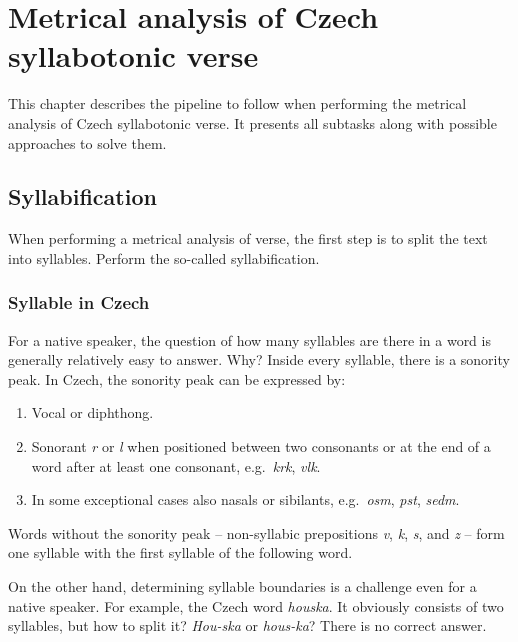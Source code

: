 \chapter{Metrical analysis of Czech syllabotonic verse}\label{chap:metrical-analysis}

\begin{chapterabstract}
This chapter describes the pipeline to follow when performing the metrical analysis of Czech syllabotonic verse. It presents all subtasks along with possible approaches to solve them.
\end{chapterabstract}

\section{Syllabification}
When performing a metrical analysis of verse, the first step is to split the text into syllables. Perform the so-called syllabification.

\subsection{Syllable in Czech}
For a native speaker, the question of how many syllables are there in a word is generally relatively easy to answer. Why? Inside every syllable, there is a sonority peak. In Czech, the sonority peak can be expressed by:

\begin{enumerate}
    \item Vocal or diphthong.
    \item Sonorant \emph{r} or \emph{l} when positioned between two consonants or at the end of a word after at least one consonant, e.g.~\emph{krk}, \emph{vlk}.
    \item In some exceptional cases also nasals or sibilants, e.g.~\emph{osm}, \emph{pst}, \emph{sedm}.
\end{enumerate}

Words without the sonority peak -- non-syllabic prepositions \emph{v}, \emph{k}, \emph{s}, and \emph{z} -- form one syllable with the first syllable of the following word.

On the other hand, determining syllable boundaries is a challenge even for a native speaker. For example, the Czech word \emph{houska}. It obviously consists of two syllables, but how to split it? \emph{Hou-ska} or \emph{hous-ka}? There is no correct answer.~\cite{UvodTeorieVerse}


